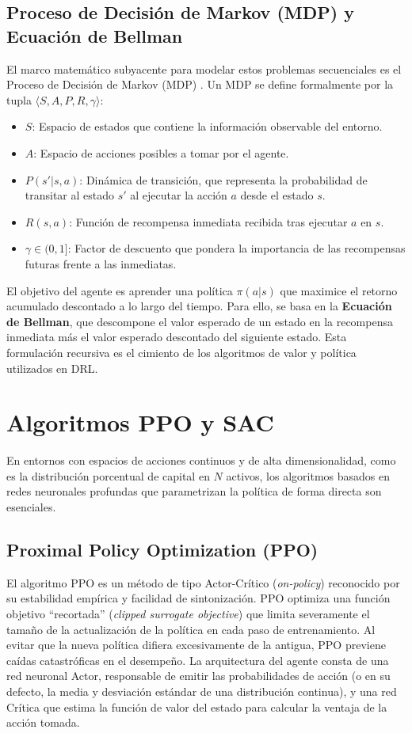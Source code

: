 \subsection{Proceso de Decisión de Markov (MDP) y Ecuación de Bellman}
El marco matemático subyacente para modelar estos problemas secuenciales es el Proceso de Decisión de Markov (MDP) \citep{bellman1957markovian}. Un MDP se define formalmente por la tupla $\langle S, A, P, R, \gamma \rangle$:
\begin{itemize}
    \item $S$: Espacio de estados que contiene la información observable del entorno.
    \item $A$: Espacio de acciones posibles a tomar por el agente.
    \item $P(s'|s,a)$: Dinámica de transición, que representa la probabilidad de transitar al estado $s'$ al ejecutar la acción $a$ desde el estado $s$.
    \item $R(s,a)$: Función de recompensa inmediata recibida tras ejecutar $a$ en $s$.
    \item $\gamma \in (0, 1]$: Factor de descuento que pondera la importancia de las recompensas futuras frente a las inmediatas.
\end{itemize}

El objetivo del agente es aprender una política $\pi(a|s)$ que maximice el retorno acumulado descontado a lo largo del tiempo. Para ello, se basa en la \textbf{Ecuación de Bellman}, que descompone el valor esperado de un estado en la recompensa inmediata más el valor esperado descontado del siguiente estado. Esta formulación recursiva es el cimiento de los algoritmos de valor y política utilizados en DRL.

\section{Algoritmos PPO y SAC}
En entornos con espacios de acciones continuos y de alta dimensionalidad, como es la distribución porcentual de capital en $N$ activos, los algoritmos basados en redes neuronales profundas que parametrizan la política de forma directa son esenciales.

\subsection{Proximal Policy Optimization (PPO)}
El algoritmo PPO \citep{schulman2017proximal} es un método de tipo Actor-Crítico (\textit{on-policy}) reconocido por su estabilidad empírica y facilidad de sintonización. PPO optimiza una función objetivo ``recortada'' (\textit{clipped surrogate objective}) que limita severamente el tamaño de la actualización de la política en cada paso de entrenamiento. Al evitar que la nueva política difiera excesivamente de la antigua, PPO previene caídas catastróficas en el desempeño. La arquitectura del agente consta de una red neuronal Actor, responsable de emitir las probabilidades de acción (o en su defecto, la media y desviación estándar de una distribución continua), y una red Crítica que estima la función de valor del estado para calcular la ventaja de la acción tomada.

